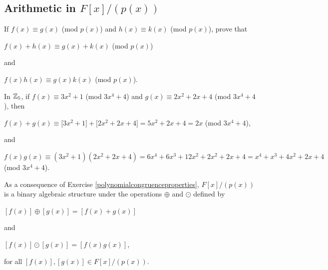 \documentclass[11pt,fleqn,dvipsnames,usenames]{article}
\newcommand{\p}{\noindent}
\begin{document}
\subsection{Arithmetic in $F[x]/(p(x))$}
%
\begin{exercise}\label{polynomialcongruenceproperties}
If $f(x)\equiv g(x)$ (mod $p(x)$) and $h(x)\equiv k(x)$ (mod $p(x)$), prove that
\begin{center}
$f(x) + h(x) \equiv g(x) + k(x)$ (mod $p(x)$)
\end{center}
and
\begin{center}
$f(x)h(x) \equiv g(x)k(x)$ (mod $p(x)$).
\end{center}
\end{exercise}
%
\begin{example}
In $\mathbb{Z}_5$, if $f(x)\equiv 3x^2 + 1$ (mod $3x^4 + 4$) and $g(x)\equiv 2x^2 + 2x + 4$ (mod $3x^4 + 4$), then
\begin{center}
$f(x) + g(x) \equiv \big[3x^2 + 1\big] + \big[2x^2 + 2x + 4\big] = 5x^2 + 2x + 4= 2x$ (mod $3x^4 + 4$),
\end{center}
and
\vsmsp

\begin{adjustwidth}{-100pt}{-100pt}
\begin{center}
$f(x)g(x) \equiv (3x^2 + 1)(2x^2 + 2x + 4) = 6x^4 + 6x^3 + 12x^2 + 2x^2 + 2x + 4 = x^4 + x^3 + 4x^2 + 2x +4$ (mod $3x^4 + 4$).
\end{center}
\end{adjustwidth}
\end{example}
\vsmsp

\p As a consequence of Exercise \ref{polynomialcongruenceproperties}, $F[x]/(p(x))$ is a binary algebraic structure under the operations $\oplus$ and $\odot$ defined by
\begin{center}
$[f(x)]\oplus [g(x)] = [f(x) + g(x)]$
\end{center}
and
\begin{center}
$[f(x)]\odot [g(x)] = [f(x)g(x)]$,
\end{center}
for all $[f(x)],[g(x)]\in F[x]/(p(x))$.
\vsp
\end{document}
